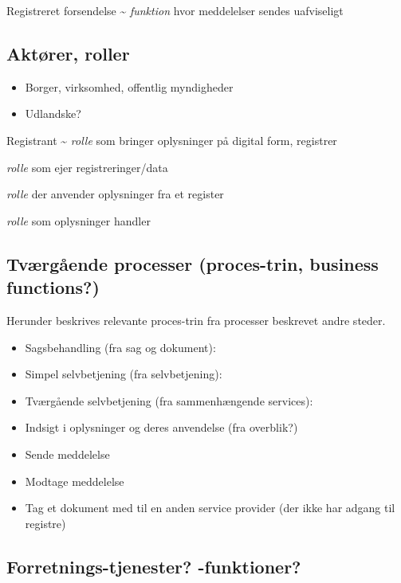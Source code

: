 Registreret forsendelse \textasciitilde{} \emph{funktion} hvor
meddelelser sendes uafviseligt

\subsection{Aktører, roller}\label{aktuxf8rer-roller}

\begin{itemize}
\tightlist
\item
  Borger, virksomhed, offentlig myndigheder
\item
  Udlandske?
\end{itemize}

Registrant \textasciitilde{} \emph{rolle} som bringer oplysninger på
digital form, registrer

\begin{description}
\tightlist
\item[Dataejer]
\emph{rolle} som ejer registreringer/data
\item[Dataanvender]
\emph{rolle} der anvender oplysninger fra et register
\item[Datasubject]
\emph{rolle} som oplysninger handler
\end{description}

\subsection{Tværgående processer (proces-trin, business
functions?)}\label{tvuxe6rguxe5ende-processer-proces-trin-business-functions}

Herunder beskrives relevante proces-trin fra processer beskrevet andre
steder.

\begin{itemize}
\item
  Sagsbehandling (fra sag og dokument):
\item
  Simpel selvbetjening (fra selvbetjening):
\item
  Tværgående selvbetjening (fra sammenhængende services):
\item
  Indsigt i oplysninger og deres anvendelse (fra overblik?)
\item
  Sende meddelelse
\item
  Modtage meddelelse
\item
  Tag et dokument med til en anden service provider (der ikke har adgang
  til registre)
\end{itemize}

\subsection{Forretnings-tjenester?
-funktioner?}\label{forretnings-tjenester--funktioner}

